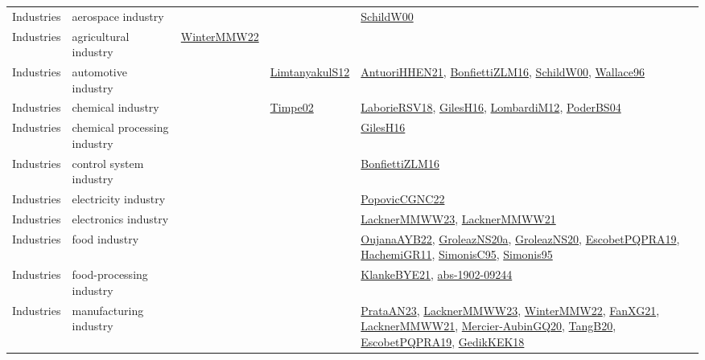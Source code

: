 {\begin{longtable}{lp{3cm}>{\raggedright}p{6cm}>{\raggedright}p{6cm}p{8cm}}
Industries & aerospace industry &  &  & \href{articles/SchildW00.pdf}{SchildW00}\cite{SchildW00}\\
Industries & agricultural industry & \href{papers/WinterMMW22.pdf}{WinterMMW22}\cite{WinterMMW22} &  & \\
Industries & automotive industry &  & \href{articles/LimtanyakulS12.pdf}{LimtanyakulS12}\cite{LimtanyakulS12} & \href{papers/AntuoriHHEN21.pdf}{AntuoriHHEN21}\cite{AntuoriHHEN21}, \href{papers/BonfiettiZLM16.pdf}{BonfiettiZLM16}\cite{BonfiettiZLM16}, \href{articles/SchildW00.pdf}{SchildW00}\cite{SchildW00}, \href{articles/Wallace96.pdf}{Wallace96}\cite{Wallace96}\\
Industries & chemical industry &  & \href{articles/Timpe02.pdf}{Timpe02}\cite{Timpe02} & \href{articles/LaborieRSV18.pdf}{LaborieRSV18}\cite{LaborieRSV18}, \href{papers/GilesH16.pdf}{GilesH16}\cite{GilesH16}, \href{articles/LombardiM12.pdf}{LombardiM12}\cite{LombardiM12}, \href{articles/PoderBS04.pdf}{PoderBS04}\cite{PoderBS04}\\
Industries & chemical processing industry &  &  & \href{papers/GilesH16.pdf}{GilesH16}\cite{GilesH16}\\
Industries & control system industry &  &  & \href{papers/BonfiettiZLM16.pdf}{BonfiettiZLM16}\cite{BonfiettiZLM16}\\
Industries & electricity industry &  &  & \href{papers/PopovicCGNC22.pdf}{PopovicCGNC22}\cite{PopovicCGNC22}\\
Industries & electronics industry &  &  & \href{articles/LacknerMMWW23.pdf}{LacknerMMWW23}\cite{LacknerMMWW23}, \href{papers/LacknerMMWW21.pdf}{LacknerMMWW21}\cite{LacknerMMWW21}\\
Industries & food industry &  &  & \href{papers/OujanaAYB22.pdf}{OujanaAYB22}\cite{OujanaAYB22}, \href{papers/GroleazNS20a.pdf}{GroleazNS20a}\cite{GroleazNS20a}, \href{papers/GroleazNS20.pdf}{GroleazNS20}\cite{GroleazNS20}, \href{articles/EscobetPQPRA19.pdf}{EscobetPQPRA19}\cite{EscobetPQPRA19}, \href{articles/HachemiGR11.pdf}{HachemiGR11}\cite{HachemiGR11}, \href{papers/SimonisC95.pdf}{SimonisC95}\cite{SimonisC95}, \href{papers/Simonis95.pdf}{Simonis95}\cite{Simonis95}\\
Industries & food-processing industry &  &  & \href{papers/KlankeBYE21.pdf}{KlankeBYE21}\cite{KlankeBYE21}, \href{articles/abs-1902-09244.pdf}{abs-1902-09244}\cite{abs-1902-09244}\\
Industries & manufacturing industry &  &  & \href{articles/PrataAN23.pdf}{PrataAN23}\cite{PrataAN23}, \href{articles/LacknerMMWW23.pdf}{LacknerMMWW23}\cite{LacknerMMWW23}, \href{papers/WinterMMW22.pdf}{WinterMMW22}\cite{WinterMMW22}, \href{articles/FanXG21.pdf}{FanXG21}\cite{FanXG21}, \href{papers/LacknerMMWW21.pdf}{LacknerMMWW21}\cite{LacknerMMWW21}, \href{papers/Mercier-AubinGQ20.pdf}{Mercier-AubinGQ20}\cite{Mercier-AubinGQ20}, \href{papers/TangB20.pdf}{TangB20}\cite{TangB20}, \href{articles/EscobetPQPRA19.pdf}{EscobetPQPRA19}\cite{EscobetPQPRA19}, \href{articles/GedikKEK18.pdf}{GedikKEK18}\cite{GedikKEK18}\\

\end{longtable}}
